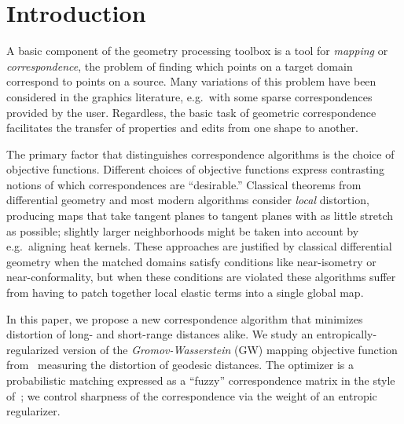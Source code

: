 
\section{Introduction}


A basic component of the geometry processing toolbox is a tool for \emph{mapping} or \emph{correspondence}, the problem of finding which points on a target domain correspond to points on a source.  Many variations of this problem have been considered in the graphics literature, e.g.\ with some sparse correspondences provided by the user.  Regardless, the basic task of geometric correspondence facilitates the transfer of properties and edits from one shape to another.

The primary factor that distinguishes correspondence algorithms is the choice of objective functions. Different choices of objective functions express contrasting notions of which correspondences are ``desirable.''  Classical theorems from differential geometry and most modern algorithms consider \emph{local} distortion, producing maps that take tangent planes to tangent planes with as little stretch as possible; slightly larger neighborhoods might be taken into account by e.g.\ aligning heat kernels.  These approaches are justified by classical differential geometry when the matched domains satisfy conditions like near-isometry or near-conformality, but when these conditions are violated these algorithms suffer from having to patch together local elastic terms into a single global map. 


In this paper, we propose a new correspondence algorithm that minimizes distortion of long- and short-range distances alike.  We study an entropically-regularized version of the \emph{Gromov-Wasserstein} (GW) mapping objective function from~\cite{memoli-2011} measuring the distortion of geodesic distances.  The optimizer is a probabilistic matching expressed as a ``fuzzy'' correspondence matrix in the style of~\cite{kim-2012,solomon-2012}; %
we control sharpness of the correspondence via the weight of an entropic regularizer.   

